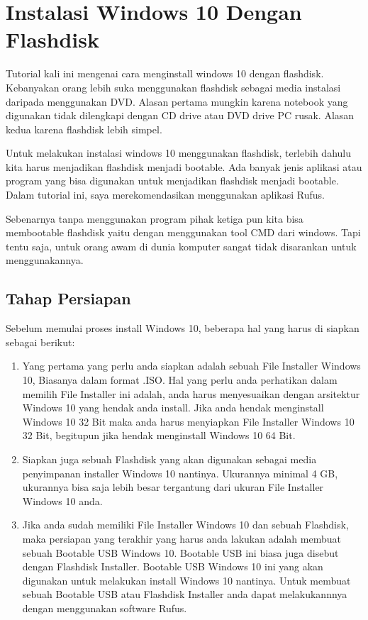 \section{Instalasi Windows 10 Dengan Flashdisk}
Tutorial kali ini mengenai cara menginstall windows 10 dengan flashdisk. Kebanyakan orang lebih suka menggunakan flashdisk sebagai media instalasi daripada menggunakan DVD. Alasan pertama mungkin karena notebook yang digunakan tidak dilengkapi dengan CD drive atau DVD drive PC rusak. Alasan kedua karena flashdisk lebih simpel.

Untuk melakukan instalasi windows 10 menggunakan flashdisk, terlebih dahulu kita harus menjadikan flashdisk menjadi bootable. Ada banyak jenis aplikasi atau program yang bisa digunakan untuk menjadikan flashdisk menjadi bootable. Dalam tutorial ini, saya merekomendasikan menggunakan aplikasi Rufus.

Sebenarnya tanpa menggunakan program pihak ketiga pun kita bisa membootable flashdisk yaitu dengan menggunakan tool CMD dari windows. Tapi tentu saja, untuk orang awam di dunia komputer sangat tidak disarankan untuk menggunakannya.

\subsection{Tahap Persiapan}
Sebelum memulai proses install Windows 10, beberapa hal yang harus di siapkan sebagai berikut:
\begin{enumerate}
  \item Yang pertama yang perlu anda siapkan adalah sebuah File Installer Windows 10, Biasanya dalam format .ISO. Hal yang perlu anda perhatikan dalam memilih File Installer ini adalah, anda harus menyesuaikan dengan arsitektur Windows 10 yang hendak anda install. Jika anda hendak menginstall Windows 10 32 Bit maka anda harus menyiapkan File Installer Windows 10 32 Bit, begitupun jika hendak menginstall Windows 10 64 Bit.
  \item Siapkan juga sebuah Flashdisk yang akan digunakan sebagai media penyimpanan installer Windows 10 nantinya. Ukurannya minimal 4 GB, ukurannya bisa saja lebih besar tergantung dari ukuran File Installer Windows 10 anda.
  \item Jika anda sudah memiliki File Installer Windows 10 dan sebuah Flashdisk, maka persiapan yang terakhir yang harus anda lakukan adalah membuat sebuah Bootable USB Windows 10. Bootable USB ini biasa juga disebut dengan Flashdisk Installer. Bootable USB Windows 10 ini yang akan digunakan untuk melakukan install Windows 10 nantinya. Untuk membuat sebuah Bootable USB atau Flashdisk Installer anda dapat melakukannnya dengan menggunakan software Rufus.
\end{enumerate}

